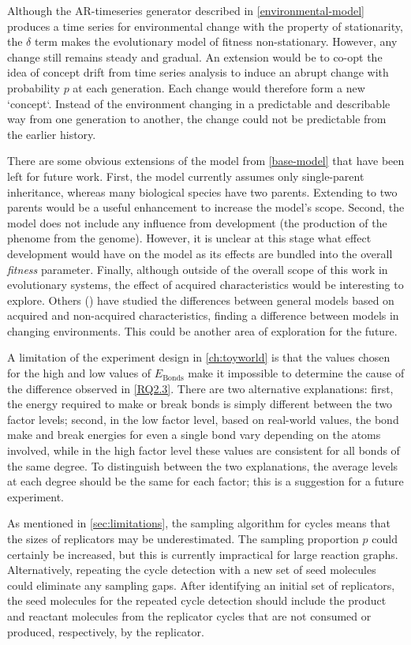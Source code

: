 Although the AR-timeseries generator described in \cref{environmental-model} produces a time series for environmental change with the property of stationarity, the $\delta$ term makes the evolutionary model of fitness non-stationary. However, any change still remains steady and gradual. An extension would be to co-opt the idea of concept drift from time series analysis to induce an abrupt change with probability $p$ at each generation. Each change would therefore form a new `concept`. Instead of the environment changing in a predictable and describable way from one generation to another, the change could not be predictable from the earlier history.

There are some obvious extensions of the model from \cref{base-model} that have been left for future work. First, the model currently assumes only single-parent inheritance, whereas many biological species have two parents. Extending to two parents would be a useful enhancement to increase the model's scope. Second, the model does not include any influence from development (the production of the phenome from the genome). However, it is unclear at this stage what effect development would have on the model as its effects are bundled into the overall \emph{fitness} parameter. Finally, although outside of the overall scope of this work in evolutionary systems, the effect of acquired characteristics would be interesting to explore. Others (\eg \textcite{Gaucherel2012,Paenke:2007ie,Sasaki:2000dq}) have studied the differences between general models based on acquired and non-acquired characteristics, finding a difference between models in changing environments. This could be another area of exploration for the future.

A limitation of the experiment design in \cref{ch:toyworld} is that the values chosen for the high and low values of $E_\mathrm{Bonds}$ make it impossible to determine the cause of the difference observed in \cref{RQ2.3}. There are two alternative explanations: first, the energy required to make or break bonds is simply different between the two factor levels; second, in the low factor level, based on real-world values, the bond make and break energies for even a single bond vary depending on the atoms involved, while in the high factor level these values are consistent for all bonds of the same degree. To distinguish between the two explanations, the average levels at each degree should be the same for each factor; this is a suggestion for a future experiment.

As mentioned in \cref{sec:limitations}, the sampling algorithm for cycles means that the sizes of replicators may be underestimated. The sampling proportion $p$ could certainly be increased, but this is currently impractical for large reaction graphs. Alternatively, repeating the cycle detection with a new set of seed molecules could eliminate any sampling gaps. After identifying an initial set of replicators, the seed molecules for the repeated cycle detection should include the product and reactant molecules from the replicator cycles that are not consumed or produced, respectively, by the replicator.

